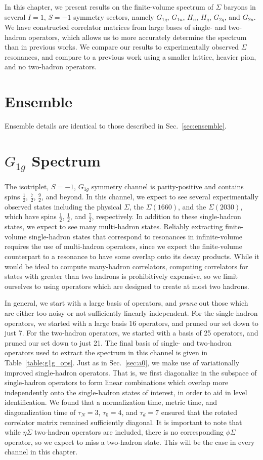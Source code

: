 In this chapter, we present results on the finite-volume spectrum of $\Sigma$ baryons in several $I=1$, $S=-1$ symmetry sectors, namely $G_{1g}$, $G_{1u}$, $H_u$, $H_g$, $G_{2g}$, and $G_{2u}$. We have constructed correlator matrices from large bases of single- and two-hadron operators, which allows us to more accurately determine the spectrum than in previous works. We compare our results to experimentally observed $\Sigma$ resonances, and compare to a previous work using a smaller lattice, heavier pion, and no two-hadron operators.
\section{Ensemble}
Ensemble details are identical to those described in Sec.~\ref{sec:ensemble}.
\section{$G_{1g}$ Spectrum}
The isotriplet, $S=-1$, $G_{1g}$ symmetry channel is parity-positive and contains spins $\frac{1}{2}$, $\frac{7}{2}$, $\frac{9}{2}$, and beyond. In this channel, we expect to see several experimentally observed states including the physical $\Sigma$, the $\Sigma(1660)$, and the $\Sigma(2030)$, which have spins $\frac{1}{2}$, $\frac{1}{2}$, and $\frac{7}{2}$, respectively. In addition to these single-hadron states, we expect to see many multi-hadron states. Reliably extracting finite-volume single-hadron states that correspond to resonances in infinite-volume requires the use of multi-hadron operators, since we expect the finite-volume counterpart to a resonance to have some overlap onto its decay products. While it would be ideal to compute many-hadron correlators, computing correlators for states with greater than two hadrons is prohibitively expensive, so we limit ourselves to using operators which are designed to create at most two hadrons.

In general, we start with a large basis of operators, and \emph{prune} out those which are either too noisy or not sufficiently linearly independent. For the single-hadron operators, we started with a large basis 16 operators, and pruned our set down to just 7. For the two-hadron operators, we started with a basis of 25 operators, and pruned our set down to just 21. The final basis of single- and two-hadron operators used to extract the spectrum in this channel is given in Table~\ref{table:g1g_ops}. Just as in Sec.~\ref{sec:a0}, we make use of variationally improved single-hadron operators. That is, we first diagonalize in the subspace of single-hadron operators to form linear combinations which overlap more independently onto the single-hadron states of interest, in order to aid in level identification. We found that a normalization time, metric time, and diagonalization time of $\tau_N=3$, $\tau_0=4$, and $\tau_d=7$ ensured that the rotated correlator matrix remained sufficiently diagonal. It is important to note that while $\eta\Sigma$ two-hadron operators are included, there is no corresponding $\phi\Sigma$ operator, so we expect to miss a two-hadron state. This will be the case in every channel in this chapter.

